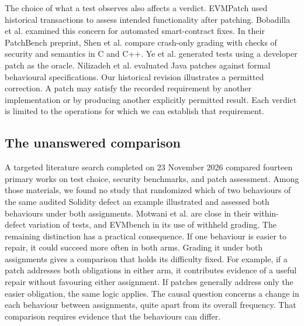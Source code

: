 The choice of what a test observes also affects a verdict. EVMPatch used historical transactions to assess intended functionality after patching. Bobadilla et al. examined this concern for automated smart-contract fixes. In their PatchBench preprint, Shen et al. compare crash-only grading with checks of security and semantics in C and C++. Ye et al. generated tests using a developer patch as the oracle. Nilizadeh et al. evaluated Java patches against formal behavioural specifications. Our historical revision illustrates a permitted correction. A patch may satisfy the recorded requirement by another implementation or by producing another explicitly permitted result. Each verdict is limited to the operations for which we can establish that requirement.~\cite{rodler2021evmpatch,bobadilla2026fixes,shen2026patchbench,ye2021assessment,nilizadeh2021overfitting}

\subsection{The unanswered comparison}

A targeted literature search completed on 23 November 2026 compared fourteen primary works on test choice, security benchmarks, and patch assessment. Among those materials, we found no study that randomized which of two behaviours of the same audited Solidity defect an example illustrated and assessed both behaviours under both assignments. Motwani et al. are close in their within-defect variation of tests, and EVMbench in its use of withheld grading. The remaining distinction has a practical consequence. If one behaviour is easier to repair, it could succeed more often in both arms. Grading it under both assignments gives a comparison that holds its difficulty fixed. For example, if a patch addresses both obligations in either arm, it contributes evidence of a useful repair without favouring either assignment. If patches generally address only the easier obligation, the same logic applies. The causal question concerns a change in each behaviour between assignments, quite apart from its overall frequency. That comparison requires evidence that the behaviours can differ.~\cite{motwani2022quality,wang2026evmbench}
